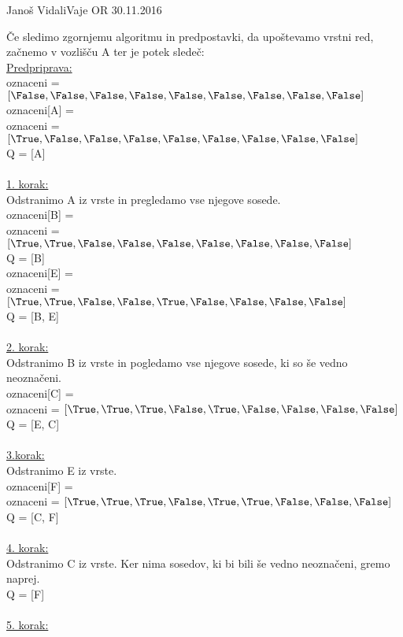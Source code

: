 \begin{naloga}{Janoš Vidali}{Vaje OR 30.11.2016}
\begin{odgovor}
\begin{small}
\begin{algorithmic}
\end{algorithmic}
\end{small}
%
Če sledimo zgornjemu algoritmu in predpostavki, da upoštevamo vrstni red, začnemo v vozlišču A ter je potek sledeč: \\
%
\underline{Predpriprava:}\\
oznaceni = $[\False, \False, \False, \False, \False, \False, \False, \False, \False]$\\
oznaceni[A] = \True\\
oznaceni = $[\True, \False, \False, \False, \False, \False, \False, \False, \False]$\\
Q = [A]\\
\\
\underline{1. korak:}\\
Odstranimo A iz vrste in pregledamo vse njegove sosede.\\
oznaceni[B] = \True\\
oznaceni = $[\True, \True, \False, \False, \False, \False, \False, \False, \False]$\\
Q = [B]\\
oznaceni[E] = \True\\
oznaceni = $[\True, \True, \False, \False, \True, \False, \False, \False, \False]$\\
Q = [B, E]\\
\\
\underline{2. korak:}\\
Odstranimo B iz vrste in pogledamo vse njegove sosede, ki so še vedno neoznačeni.\\
oznaceni[C] = \True\\
oznaceni = $[\True, \True, \True, \False, \True, \False, \False, \False, \False]$\\
Q = [E, C]\\
\\
\underline{3.korak:}\\
Odstranimo E iz vrste.\\
oznaceni[F] = \True\\
oznaceni = $[\True, \True, \True, \False, \True, \True, \False, \False, \False]$\\
Q = [C, F]\\
\\
\underline{4. korak:}\\
Odstranimo C iz vrste. Ker nima sosedov, ki bi bili še vedno neoznačeni, gremo naprej.\\
Q = [F]\\
\\
\underline{5. korak:}\\

\end{odgovor}
\end{naloga}
